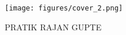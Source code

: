 
\begin{titlepage}
    \pagecolor{myOrange}\afterpage{\nopagecolor}
    \begin{addmargin}[-1cm]{-3cm}
        \linespread{1.5}

        \hfill

        \texttt{[image: figures/cover\_2.png]}
        {
          \begin{flushleft}
            \par
          \end{flushleft}
        }
        
        \vspace{81mm}

        \sffamily\huge{PRATIK RAJAN GUPTE}

        \vfill




        \vfill

  \end{addmargin}
\end{titlepage}

\nopagecolor
